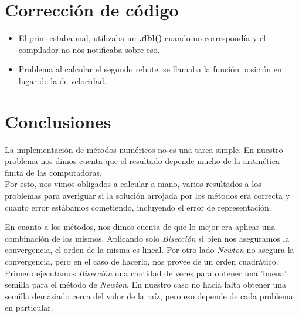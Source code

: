 \documentclass[a4paper]{article}
\begin{document}

\newpage

\section{Corrección de código}
\begin{itemize}
	\item El print estaba mal, utilizaba un \textbf{.dbl()} cuando no correspondía y el compilador no nos notificaba sobre eso.
	\item Problema al calcular el segundo rebote. se llamaba la función posición en lugar de la de velocidad.
\end{itemize}


\section{Conclusiones}
La implementación de métodos numéricos no es una tarea simple. En nuestro problema nos dimos cuenta que el resultado depende mucho de la aritmética finita de las computadoras. \\ \hspace{1em}
Por esto, nos vimos obligados a calcular a mano, varios resultados a los problemas para averiguar si la solución arrojada por los métodos era correcta y cuanto error estábamos cometiendo, incluyendo el error de representación.  \\ \vspace{1em}

En cuanto a los métodos, nos dimos cuenta de que lo mejor era aplicar una combinación de los mismos. Aplicando solo \textit{Bisección} si bien nos aseguramos la convergencia, el orden de la misma es lineal. Por otro lado \textit{Newton} no asegura la convergencia, pero en el caso de hacerlo, nos provee de un orden cuadrático. 
Primero ejecutamos \textit{Bisección} una cantidad de veces para obtener una 'buena' semilla para el método de \textit{Newton}. En nuestro caso no hacia falta obtener una semilla demasiado cerca del valor de la raíz, pero eso depende de cada problema en particular. 
\end{document}

